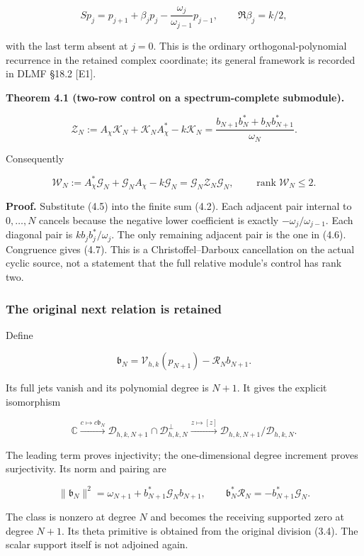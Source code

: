 \[Sp_j=p_{j+1}+\beta_jp_j-\frac{\omega_j}{\omega_{j-1}}p_{j-1},\qquad
\Re\beta_j=k/2,\tag{4.5}\]

with the last term absent at \(j=0\). This is the ordinary
orthogonal-polynomial recurrence in the retained complex coordinate; its
general framework is recorded in DLMF §18.2 {[}E1{]}.

\textbf{Theorem 4.1 (two-row control on a spectrum-complete submodule).}

\[\boxed{\mathcal Z_N:=A_\chi\mathcal K_N+\mathcal K_NA_\chi^*-k\mathcal K_N
=\frac{b_{N+1}b_N^*+b_Nb_{N+1}^*}{\omega_N}.}\tag{4.6}\]

Consequently

\[\boxed{\mathcal W_N:=A_\chi^*\mathcal G_N+\mathcal G_NA_\chi-k\mathcal G_N
=\mathcal G_N\mathcal Z_N\mathcal G_N,\qquad \operatorname{rank}\mathcal W_N\le2.}\tag{4.7}\]

\textbf{Proof.} Substitute (4.5) into the finite sum (4.2). Each
adjacent pair internal to \(0,\ldots,N\) cancels because the negative
lower coefficient is exactly \(-\omega_j/\omega_{j-1}\). Each diagonal
pair is \(k b_jb_j^*/\omega_j\). The only remaining adjacent pair is the
one in (4.6). Congruence gives (4.7). This is a Christoffel--Darboux
cancellation on the actual cyclic source, not a statement that the full
relative module's control has rank two.

\subsubsection{The original next relation is
retained}\label{cyclic_sum:the-original-next-relation-is-retained}

Define

\[\mathfrak b_N=\mathcal V_{h,k}(p_{N+1})-\mathcal R_Nb_{N+1}.\]

Its full jets vanish and its polynomial degree is \(N+1\). It gives the
explicit isomorphism

\[\boxed{\mathbb C\xrightarrow{c\mapsto c\mathfrak b_N}
\mathcal D_{h,k,N+1}\cap\mathcal D_{h,k,N}^{\perp}
\xrightarrow{z\mapsto[z]}
\mathcal D_{h,k,N+1}/\mathcal D_{h,k,N}.}\tag{4.8}\]

The leading term proves injectivity; the one-dimensional degree
increment proves surjectivity. Its norm and pairing are

\[\|\mathfrak b_N\|^2=\omega_{N+1}+b_{N+1}^*\mathcal G_Nb_{N+1},\qquad
\mathfrak b_N^*\mathcal R_N=-b_{N+1}^*\mathcal G_N.\tag{4.9}\]

The class is nonzero at degree \(N\) and becomes the receiving supported
zero at degree \(N+1\). Its theta primitive is obtained from the
original division (3.4). The scalar support itself is not adjoined
again.

